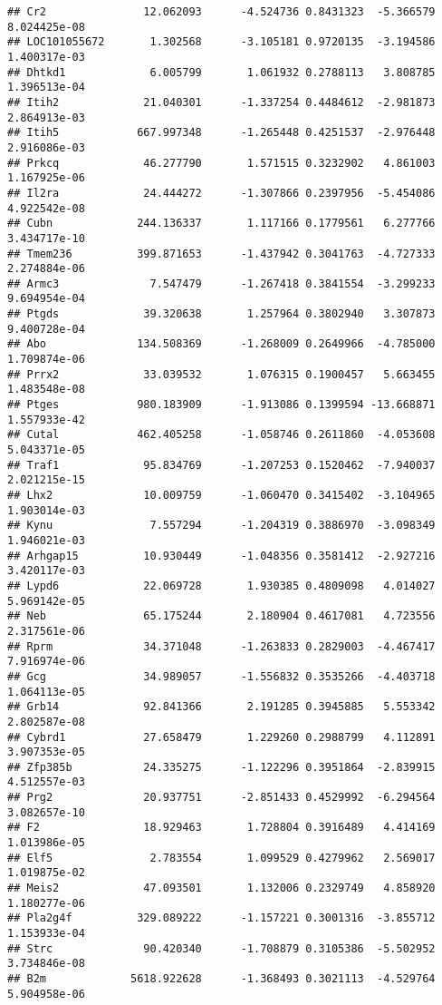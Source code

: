 \documentclass[
]{article}
\begin{document}
\begin{verbatim}
## Cr2               12.062093      -4.524736 0.8431323  -5.366579 8.024425e-08
## LOC101055672       1.302568      -3.105181 0.9720135  -3.194586 1.400317e-03
## Dhtkd1             6.005799       1.061932 0.2788113   3.808785 1.396513e-04
## Itih2             21.040301      -1.337254 0.4484612  -2.981873 2.864913e-03
## Itih5            667.997348      -1.265448 0.4251537  -2.976448 2.916086e-03
## Prkcq             46.277790       1.571515 0.3232902   4.861003 1.167925e-06
## Il2ra             24.444272      -1.307866 0.2397956  -5.454086 4.922542e-08
## Cubn             244.136337       1.117166 0.1779561   6.277766 3.434717e-10
## Tmem236          399.871653      -1.437942 0.3041763  -4.727333 2.274884e-06
## Armc3              7.547479      -1.267418 0.3841554  -3.299233 9.694954e-04
## Ptgds             39.320638       1.257964 0.3802940   3.307873 9.400728e-04
## Abo              134.508369      -1.268009 0.2649966  -4.785000 1.709874e-06
## Prrx2             33.039532       1.076315 0.1900457   5.663455 1.483548e-08
## Ptges            980.183909      -1.913086 0.1399594 -13.668871 1.557933e-42
## Cutal            462.405258      -1.058746 0.2611860  -4.053608 5.043371e-05
## Traf1             95.834769      -1.207253 0.1520462  -7.940037 2.021215e-15
## Lhx2              10.009759      -1.060470 0.3415402  -3.104965 1.903014e-03
## Kynu               7.557294      -1.204319 0.3886970  -3.098349 1.946021e-03
## Arhgap15          10.930449      -1.048356 0.3581412  -2.927216 3.420117e-03
## Lypd6             22.069728       1.930385 0.4809098   4.014027 5.969142e-05
## Neb               65.175244       2.180904 0.4617081   4.723556 2.317561e-06
## Rprm              34.371048      -1.263833 0.2829003  -4.467417 7.916974e-06
## Gcg               34.989057      -1.556832 0.3535266  -4.403718 1.064113e-05
## Grb14             92.841366       2.191285 0.3945885   5.553342 2.802587e-08
## Cybrd1            27.658479       1.229260 0.2988799   4.112891 3.907353e-05
## Zfp385b           24.335275      -1.122296 0.3951864  -2.839915 4.512557e-03
## Prg2              20.937751      -2.851433 0.4529992  -6.294564 3.082657e-10
## F2                18.929463       1.728804 0.3916489   4.414169 1.013986e-05
## Elf5               2.783554       1.099529 0.4279962   2.569017 1.019875e-02
## Meis2             47.093501       1.132006 0.2329749   4.858920 1.180277e-06
## Pla2g4f          329.089222      -1.157221 0.3001316  -3.855712 1.153933e-04
## Strc              90.420340      -1.708879 0.3105386  -5.502952 3.734846e-08
## B2m             5618.922628      -1.368493 0.3021113  -4.529764 5.904958e-06

\end{verbatim}
\end{document}
